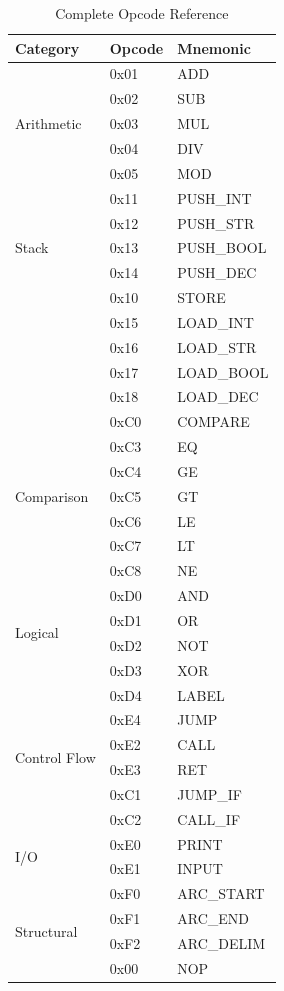 \documentclass[11pt,a4paper]{article}
\begin{document}
\begin{table}[h]
\centering
\small
\begin{tabular}{@{}lll@{}}
\toprule
Category & Opcode & Mnemonic \\
\midrule
\multirow{5}{*}{Arithmetic} & 0x01 & ADD \\
& 0x02 & SUB \\
& 0x03 & MUL \\
& 0x04 & DIV \\
& 0x05 & MOD \\
\midrule
\multirow{5}{*}{Stack} & 0x11 & PUSH\_INT \\
& 0x12 & PUSH\_STR \\
& 0x13 & PUSH\_BOOL \\
& 0x14 & PUSH\_DEC \\
\midrule
\multirow{5}{*}{Variables} & 0x10 & STORE \\
& 0x15 & LOAD\_INT \\
& 0x16 & LOAD\_STR \\
& 0x17 & LOAD\_BOOL \\
& 0x18 & LOAD\_DEC \\
\midrule
\multirow{7}{*}{Comparison} & 0xC0 & COMPARE \\
& 0xC3 & EQ \\
& 0xC4 & GE \\
& 0xC5 & GT \\
& 0xC6 & LE \\
& 0xC7 & LT \\
& 0xC8 & NE \\
\midrule
\multirow{4}{*}{Logical} & 0xD0 & AND \\
& 0xD1 & OR \\
& 0xD2 & NOT \\
& 0xD3 & XOR \\
\midrule
\multirow{6}{*}{Control Flow} & 0xD4 & LABEL \\
& 0xE4 & JUMP \\
& 0xE2 & CALL \\
& 0xE3 & RET \\
& 0xC1 & JUMP\_IF \\
& 0xC2 & CALL\_IF \\
\midrule
\multirow{2}{*}{I/O} & 0xE0 & PRINT \\
& 0xE1 & INPUT \\
\midrule
\multirow{4}{*}{Structural} & 0xF0 & ARC\_START \\
& 0xF1 & ARC\_END \\
& 0xF2 & ARC\_DELIM \\
& 0x00 & NOP \\
\bottomrule
\end{tabular}
\caption{Complete Opcode Reference}
\end{table}
\end{document}
